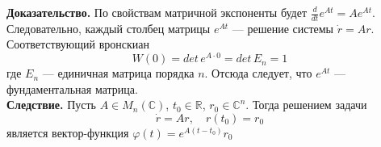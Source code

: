 \noindent \textbf{Доказательство.} По свойствам матричной экспоненты будет $\frac{d}{dt}e^{At} = Ae^{At}$. Следовательно, каждый столбец матрицы $e^{At}$ --- решение системы $\dot{r} = Ar$. Соответствующий вронскиан
\begin{equation*}
    W(0) = det\, e^{A\cdot 0} = det\, E_n = 1
\end{equation*}
где $E_n$ --- единичная матрица порядка $n$. Отсюда следует, что $e^{At}$ --- фундаментальная матрица.\\

\noindent \textbf{Следствие.} Пусть $A \in M_n(\mathbb{C})$, $t_0 \in \mathbb{R}$, $r_0 \in \mathbb{C}^n$. Тогда решением задачи
\begin{equation*}
    \dot{r} = Ar, \quad r(t_0) = r_0
\end{equation*}
является вектор-функция $\varphi(t) = e^{A(t - t_0)}r_0$
